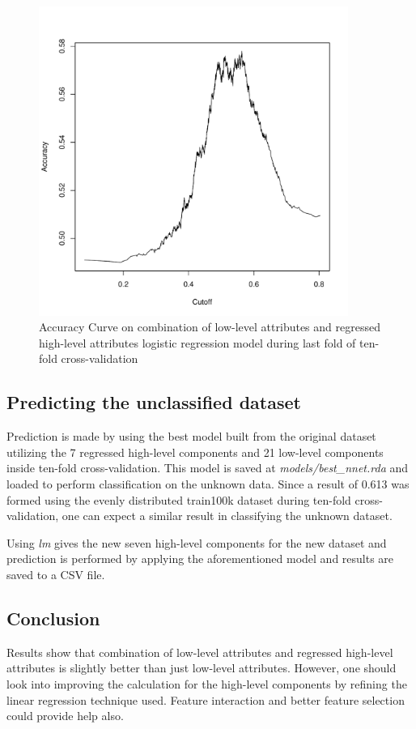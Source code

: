 \documentclass[11pt]{article}
\begin{document}
\begin{figure}[H]
  \centering
    \includegraphics[width=0.9\textwidth]{t3/acc_low_reg_hl}
    \caption{Accuracy Curve on combination of low-level attributes and regressed high-level attributes logistic regression model during last fold of ten-fold cross-validation}
    \label{fig:t3_acc_low_reg_hl}
\end{figure}

\pagebreak\subsection{Predicting the unclassified dataset}
Prediction is made by using the best model built from the original dataset utilizing the 7 regressed high-level components and 21 low-level components inside ten-fold cross-validation. This model is saved at \textit{models/best\_nnet.rda} and loaded to perform classification on the unknown data. Since a result of 0.613 was formed using the evenly distributed train100k dataset during ten-fold cross-validation, one can expect a similar result in classifying the unknown dataset.

Using \textit{lm} gives the new seven high-level components for the new dataset and prediction is performed by applying the aforementioned model and results are saved to a CSV file.

\subsection{Conclusion}
Results show that combination of low-level attributes and regressed high-level attributes is slightly better than just low-level attributes. However, one should look into improving the calculation for the high-level components by refining the linear regression technique used. Feature interaction and better feature selection could provide help also.  
 
\end{document}
